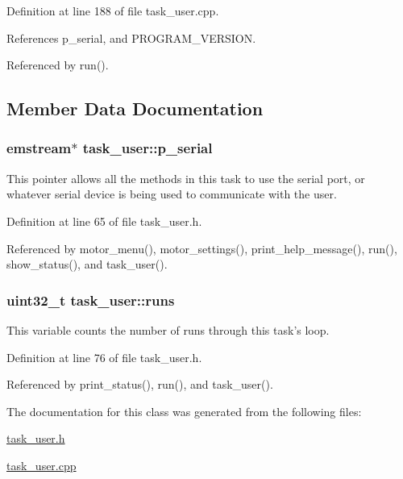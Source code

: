 \-Definition at line 188 of file task\-\_\-user.\-cpp.



\-References p\-\_\-serial, and \-P\-R\-O\-G\-R\-A\-M\-\_\-\-V\-E\-R\-S\-I\-O\-N.



\-Referenced by run().



\subsection{\-Member \-Data \-Documentation}
\hypertarget{classtask__user_a04ed5c2b4d7c9a1530bde6f217e01681}{
\subsubsection[{p\-\_\-serial}]{\setlength{\rightskip}{0pt plus 5cm}emstream$\ast$ {\bf task\-\_\-user\-::p\-\_\-serial}}}\label{classtask__user_a04ed5c2b4d7c9a1530bde6f217e01681}
\-This pointer allows all the methods in this task to use the serial port, or whatever serial device is being used to communicate with the user. 

\-Definition at line 65 of file task\-\_\-user.\-h.



\-Referenced by motor\-\_\-menu(), motor\-\_\-settings(), print\-\_\-help\-\_\-message(), run(), show\-\_\-status(), and task\-\_\-user().

\hypertarget{classtask__user_ac85973422902084fc9a4692250be32fe}{
\subsubsection[{runs}]{\setlength{\rightskip}{0pt plus 5cm}uint32\-\_\-t {\bf task\-\_\-user\-::runs}}}\label{classtask__user_ac85973422902084fc9a4692250be32fe}
\-This variable counts the number of runs through this task's loop. 

\-Definition at line 76 of file task\-\_\-user.\-h.



\-Referenced by print\-\_\-status(), run(), and task\-\_\-user().



\-The documentation for this class was generated from the following files\-:\begin{DoxyCompactItemize}
\item 
\hyperlink{task__user_8h}{task\-\_\-user.\-h}\item 
\hyperlink{task__user_8cpp}{task\-\_\-user.\-cpp}\end{DoxyCompactItemize}
